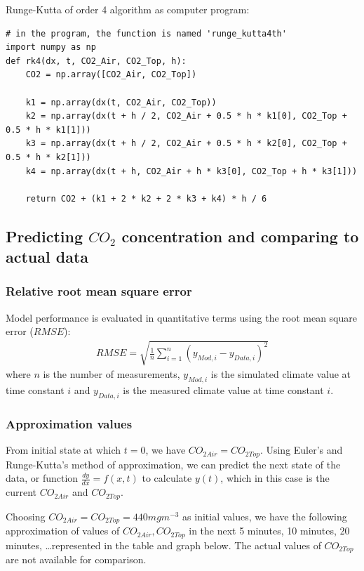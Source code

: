 \documentclass[a4paper]{article}
\numberwithin{equation}{section}
\begin{document}
Runge-Kutta of order 4 algorithm as computer program:
\begin{mdframed}[leftline=false,rightline=false,backgroundcolor=magenta!10,nobreak=true]
  \begin{verbatim}
# in the program, the function is named 'runge_kutta4th'
import numpy as np
def rk4(dx, t, CO2_Air, CO2_Top, h):
    CO2 = np.array([CO2_Air, CO2_Top])

    k1 = np.array(dx(t, CO2_Air, CO2_Top))
    k2 = np.array(dx(t + h / 2, CO2_Air + 0.5 * h * k1[0], CO2_Top + 0.5 * h * k1[1]))
    k3 = np.array(dx(t + h / 2, CO2_Air + 0.5 * h * k2[0], CO2_Top + 0.5 * h * k2[1]))
    k4 = np.array(dx(t + h, CO2_Air + h * k3[0], CO2_Top + h * k3[1]))

    return CO2 + (k1 + 2 * k2 + 2 * k3 + k4) * h / 6
  \end{verbatim}
\end{mdframed}

\subsection{Predicting \texorpdfstring{\(CO_2\)}{} concentration and comparing to actual data}
\subsubsection{Relative root mean square error}
Model performance is evaluated in quantitative terms using the root mean square error (\(RMSE\)):
\begin{align}
  \label{eq:rmse}
  RMSE = \sqrt{\frac{1}{n} \sum_{i=1}^{n} {\left(y_{Mod,i} - y_{Data,i}\right)}^2}
\end{align}
where \(n\) is the number of measurements, \(y_{Mod,i}\) is the simulated climate value at time constant \(i\) and \(y_{Data,i}\) is the measured climate value at time constant \(i\).

\subsubsection{Approximation values}
From initial state at which \(t = 0\), we have \(CO_{2Air} = CO_{2Top}\). Using Euler's and Runge-Kutta's method of approximation, we can predict the next state of the data, or function \(\frac{dy}{dx} = f(x, t)\) to calculate \(y(t)\), which in this case is the current \(CO_{2Air}\) and \(CO_{2Top}\).

Choosing \(CO_{2Air} = CO_{2Top} = 440 mg m^{-3}\) as initial values, we have the following approximation of values of \(CO_{2Air}, CO_{2Top}\) in the next 5 minutes, 10 minutes, 20 minutes, \dots represented in the table and graph below. The actual values of \(CO_{2Top}\) are not available for comparison.
\end{document}
